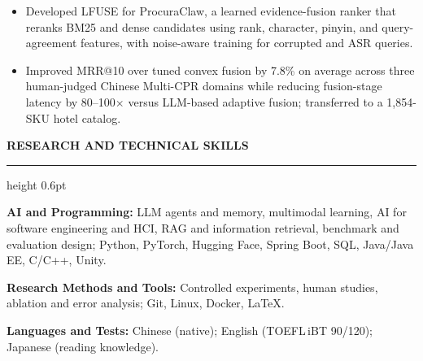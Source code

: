 \documentclass[10pt,a4paper]{article}
\newcommand{\cvsection}[1]{%
  \vspace{4.8pt}%
  {\sffamily\bfseries\fontsize{10.9}{12.7}\selectfont
    \color{navy}\MakeUppercase{#1}}\par
  \vspace{1.5pt}%
  {\color{rule}\hrule height 0.6pt}\vspace{4.2pt}%
}
\newenvironment{cvitems}{%
  \begin{itemize}[
    label=\textbullet,
    leftmargin=11.5pt,
    labelsep=4.4pt,
    itemindent=0pt,
    topsep=0.3pt,
    partopsep=0pt,
    parsep=0pt,
    itemsep=2.0pt
  ]
  \fontsize{9.65}{12.15}\selectfont
}{\end{itemize}\vspace{2.7pt}}
\begin{document}
\begin{cvitems}
  \item Developed LFUSE for ProcuraClaw, a learned evidence-fusion
  ranker that reranks BM25 and dense candidates using rank, character,
  pinyin, and query-agreement features, with noise-aware training for
  corrupted and ASR queries.

  \item Improved MRR@10 over tuned convex fusion by 7.8\% on average
  across three human-judged Chinese Multi-CPR domains while reducing
  fusion-stage latency by 80--100$\times$ versus LLM-based adaptive
  fusion; transferred to a 1,854-SKU hotel catalog.
\end{cvitems}

\cvsection{Research and Technical Skills}

{\fontsize{9.25}{11.55}\selectfont
  \textbf{AI and Programming:}
  LLM agents and memory, multimodal learning, AI for software
  engineering and HCI, RAG and information retrieval, benchmark and
  evaluation design; Python, PyTorch, Hugging Face, Spring Boot, SQL,
  Java/Java EE, C/C++, Unity.\par

  \textbf{Research Methods and Tools:}
  Controlled experiments, human studies, ablation and error
  analysis; Git, Linux, Docker, \LaTeX.\par

  \textbf{Languages and Tests:}
  Chinese (native); English (TOEFL\,iBT 90/120); Japanese
  (reading knowledge).\par
}
\end{document}

